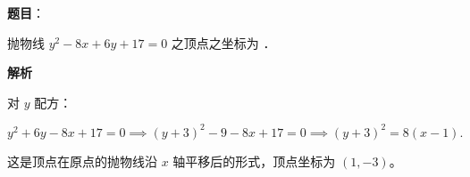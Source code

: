\begin{answer}

\textbf{题目}：

抛物线 $y^2-8x+6y+17=0$ 之顶点之坐标为 \gkblank{}．

\textbf{解析}

对 $y$ 配方：

\nopagebreak[4]
\[
y^2+6y-8x+17=0
\implies (y+3)^2-9-8x+17=0
\implies (y+3)^2=8(x-1).
\]

这是顶点在原点的抛物线沿 $x$ 轴平移后的形式，顶点坐标为 $(1,-3)$。


\par\medskip

\end{answer}

